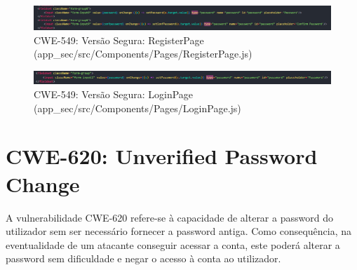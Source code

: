 \begin{figure}[H]
  \centering
  \includegraphics[width=16cm]{images/CWE549-safe-RegisterPage.png}
  \caption{CWE-549: Versão Segura: RegisterPage (app\_sec/src/Components/Pages/RegisterPage.js)}
  \label{fig:cwe549-safe-registerpage}
\end{figure}

\begin{figure}[H]
  \centering
  \includegraphics[width=16cm]{images/CWE549-safe-LoginPage.png}
  \caption{CWE-549: Versão Segura: LoginPage (app\_sec/src/Components/Pages/LoginPage.js)}
  \label{fig:cwe549-safe-loginpage}
\end{figure}
%
%
\section{CWE-620: Unverified Password Change}
A vulnerabilidade CWE-620 refere-se à capacidade de alterar a password do utilizador sem ser necessário fornecer a password antiga. Como consequência, na eventualidade de um atacante conseguir acessar a conta, este poderá alterar a password sem dificuldade e negar o acesso à conta ao utilizador.
\label{sec.cwe620}
